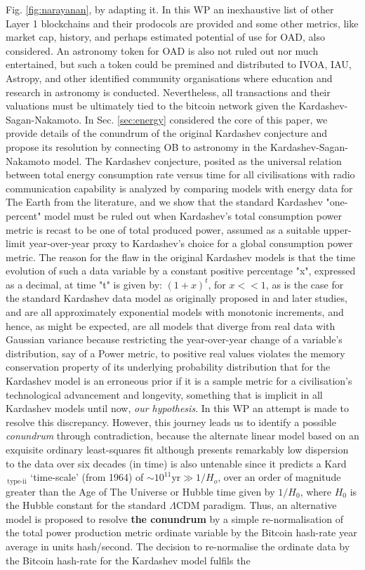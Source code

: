 \documentclass[final,5p,times,twocolumn,authoryear]{elsarticle}
\begin{document}
Fig. \ref{fig:narayanan}, by adapting it. In this WP an inexhaustive list of other Layer 1 blockchains and their prodocols are provided and some other metrics, like market cap, history, and perhaps estimated potential of use for OAD, also considered. An astronomy token for OAD is also not ruled out nor much entertained, but such a token could be premined and distributed to IVOA, IAU, Astropy, and other identified community organisations where education and research in astronomy is conducted. Nevertheless, all transactions and their valuations must be ultimately tied to the bitcoin network given the Kardashev-Sagan-Nakamoto. In Sec. \ref{sec:energy} considered the core of this paper, we provide details of the conundrum of the original Kardashev conjecture and propose its resolution by connecting OB to astronomy in the Kardashev-Sagan-Nakamoto model. The Kardashev conjecture, posited as the universal relation between total energy consumption rate versus time for all civilisations with radio communication capability is analyzed by comparing models with energy data for The Earth from the literature, and we show that the standard Kardashev "one-percent" model must be ruled out when Kardashev's total consumption power metric is recast to be one of total produced power, assumed as a suitable upper-limit year-over-year proxy to Kardashev's choice for a global consumption power metric. The reason for the flaw in the original Kardashev models is that the time evolution of such a data variable by a constant positive percentage "x", expressed as a decimal, at time "t" is given by: $(1+x)^{t}$, for $x<< 1$, as is the case for the standard Kardashev data model as originally proposed in \cite{kar64} and later studies,\citep[eg.,][]{sagan73} and \cite{gray2020} are all approximately exponential models with monotonic increments, and hence, as might be expected, are all models that diverge from real data with Gaussian variance because restricting the year-over-year change of a variable's distribution, say of a Power metric, to positive real values violates the memory conservation property of its underlying probability distribution that for the Kardashev model is an erroneous prior if it is a sample metric for a civilisation's technological advancement and longevity, something that is implicit in all Kardashev models until now, \textit{our hypothesis}. In this WP an attempt is made to resolve this discrepancy. However, this journey leads us to identify a possible \textit{conundrum} through contradiction, because the alternate linear model based on an exquisite ordinary least-squares fit although presents remarkably low dispersion to the data over six decades (in time) is also untenable since it predicts a Kard$\,_{\textrm{type-ii}}$ `time-scale' (from 1964) of $\sim 10^{11} \textrm{yr} \gg {1/H_o}$, over an order of magnitude greater than the Age of The Universe or Hubble time given by $1/H{_0}$, where $H_{0}$ is the Hubble constant for the standard $\Lambda$CDM paradigm. Thus, an alternative model is proposed to resolve \textbf{ the conundrum} by a simple re-normalisation of the total power production metric ordinate variable by the Bitcoin hash-rate year average in units hash/second. The decision to re-normalise the ordinate data by the Bitcoin hash-rate for the Kardashev model fulfils the 
\end{document}
